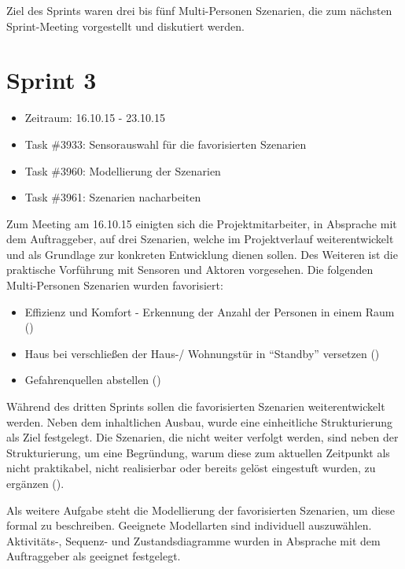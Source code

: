 \documentclass[12pt, oneside, smallheadings]{scrbook}
\begin{document}
Ziel des Sprints waren drei bis fünf Multi-Personen Szenarien, die zum nächsten Sprint-Meeting vorgestellt und diskutiert werden.

\section{Sprint 3}
\begin{itemize}
	\item Zeitraum: 16.10.15 - 23.10.15 \newline
	\item Task \#3933: Sensorauswahl für die favorisierten Szenarien
	\item Task \#3960: Modellierung der Szenarien
	\item Task \#3961: Szenarien nacharbeiten\\
\end{itemize}
\noindent
Zum Meeting am 16.10.15 einigten sich die Projektmitarbeiter, in Absprache mit dem Auftraggeber, auf drei Szenarien, welche im Projektverlauf weiterentwickelt und als Grundlage zur konkreten Entwicklung dienen sollen. Des Weiteren ist die praktische Vorführung mit Sensoren und Aktoren vorgesehen.
Die folgenden Multi-Personen Szenarien wurden favorisiert:
\begin{itemize}
	\item Effizienz und Komfort - Erkennung der Anzahl der Personen in einem Raum ()
	\item Haus bei verschließen der Haus-/ Wohnungstür in "`Standby"' versetzen ()
	\item Gefahrenquellen abstellen ()\\
\end{itemize}
\noindent
Während des dritten Sprints sollen die favorisierten Szenarien weiterentwickelt werden. Neben dem inhaltlichen Ausbau, wurde eine einheitliche Strukturierung als Ziel festgelegt. Die Szenarien, die nicht weiter verfolgt werden, sind neben der Strukturierung, um eine Begründung, warum diese zum aktuellen Zeitpunkt als nicht praktikabel, nicht realisierbar oder bereits gelöst eingestuft wurden, zu ergänzen ().

Als weitere Aufgabe steht die Modellierung der favorisierten Szenarien, um diese formal zu beschreiben. Geeignete Modellarten sind individuell auszuwählen. Aktivitäts-, Sequenz- und Zustandsdiagramme wurden in Absprache mit dem Auftraggeber als geeignet festgelegt.
\end{document}
